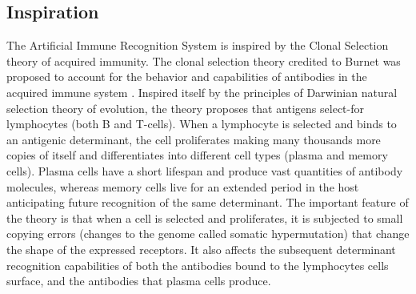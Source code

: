 \subsection{Inspiration}
The Artificial Immune Recognition System is inspired by the Clonal Selection theory of acquired immunity.
The clonal selection theory credited to Burnet was proposed to account for the behavior and capabilities of antibodies in the acquired immune system \cite{Burnet1957, Burnet1959}. Inspired itself by the principles of Darwinian natural selection theory of evolution, the theory proposes that antigens select-for lymphocytes (both B and T-cells). When a lymphocyte is selected and binds to an antigenic determinant, the cell proliferates making many thousands more copies of itself and differentiates into different cell types (plasma and memory cells). Plasma cells have a short lifespan and produce vast quantities of antibody molecules, whereas memory cells live for an extended period in the host anticipating future recognition of the same determinant. The important feature of the theory is that when a cell is selected and proliferates, it is subjected to small copying errors (changes to the genome called somatic hypermutation) that change the shape of the expressed receptors. It also affects the  subsequent determinant recognition capabilities of both the antibodies bound to the lymphocytes cells surface, and the antibodies that plasma cells produce.

